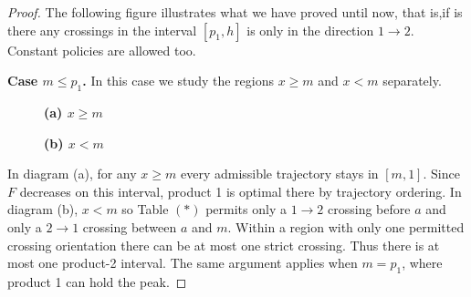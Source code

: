 \documentclass[11pt]{article}
\begin{document}
\begin{proof}
The following figure illustrates what we have proved until now, that is,if is there any crossings in the interval $[p_1,h]$ is only in the direction $1 \rightarrow 2$. Constant policies are allowed too.

\begin{figure}[H]
\centering
{}
\label{fig:middle-interval-policy}
\end{figure}

\medskip\noindent\textbf{Case $m\le p_1$.}
In this case we study the regions $x\ge m$ and $x<m$ separately.

\begin{figure}[H]
\centering
\begin{minipage}{0.48\textwidth}
\centering
\textbf{(a) $x\ge m$}\par\smallskip
{}
\end{minipage}\hfill
\begin{minipage}{0.48\textwidth}
\centering
\textbf{(b) $x<m$}\par\smallskip
{}
\end{minipage}
\end{figure}

In diagram (a), for any $x\ge m$ every admissible trajectory stays in $[m,1]$. Since $F$ decreases on this interval, product 1 is optimal there by trajectory ordering.
In diagram (b), $x<m$ so Table $(*)$ permits only a $1\to2$ crossing before $a$ and only a $2\to1$ crossing between $a$ and $m$.
Within a region with only one permitted crossing orientation there can be at most one strict crossing. Thus there is at most one product-2 interval.
The same argument applies when $m=p_1$, where product 1 can hold the peak. 


\end{proof}
\end{document}
